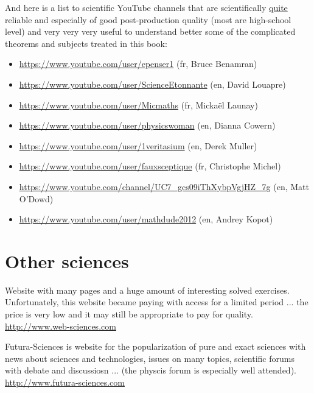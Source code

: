 	\pagebreak
	And here is a list to scientific YouTube channels that are scientifically \underline{quite} reliable and especially of good post-production quality (most are high-school level) and very very very useful to understand better some of the complicated theorems and subjects treated in this book:
	\begin{itemize}
		 \item \url{https://www.youtube.com/user/epenser1} (fr, Bruce Benamran)
		 
		 \item \url{https://www.youtube.com/user/ScienceEtonnante} (en, David Louapre)
		 
		 \item \url{https://www.youtube.com/user/Micmaths} (fr, Mickaël Launay)
		 
		 \item \url{https://www.youtube.com/user/physicswoman} (en, Dianna Cowern)
		 
		 \item \url{https://www.youtube.com/user/1veritasium} (en, Derek Muller)
		 
		 \item \url{https://www.youtube.com/user/fauxsceptique} (fr, Christophe Michel)
		 
		 \item \url{https://www.youtube.com/channel/UC7_gcs09iThXybpVgjHZ_7g} (en, Matt O'Dowd)
		 
		 \item \url{https://www.youtube.com/user/mathdude2012} (en, Andrey Kopot)
	\end{itemize}

	\pagebreak
	\section{Other sciences}

	{\Large {}}{\Large {}}{\Large {}}{\Large {}}\bcdfrance{} Website with many pages and a huge amount of interesting solved exercises. Unfortunately, this website became paying with access for a limited period ... the price is very low and it may still be appropriate to pay for quality.\\
	\href{http://www.web-sciences.com}{\color{blue}http://www.web-sciences.com}
	
	{\Large {}}{\Large {}}{\Large {}}{\Large {}}{\Large {}}\bcdfrance{} Futura-Sciences is website for the popularization of pure and exact sciences with news about sciences and technologies, issues on many topics, scientific forums with debate and discussiosn ... (the physcis forum is especially well attended).\\
	\href{http://www.futura-sciences.com}{\color{blue}http://www.futura-sciences.com}
	

